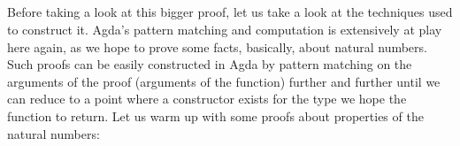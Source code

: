 {\begin{code}%
\>[0]\AgdaSpace{}%
\AgdaSymbol{:}%
\>[945I]\AgdaSymbol{(}\AgdaSpace{}%
\AgdaSymbol{:}\AgdaSpace{}%
\AgdaSymbol{)}\AgdaSpace{}%
\<%
\\
\>[.][@{}l@{}]\<[945I]%
\>[10]\AgdaSpace{}%
\AgdaSymbol{(}\AgdaSpace{}%
\AgdaSymbol{)}\AgdaSpace{}%
\AgdaSymbol{(}\AgdaSpace{}%
\AgdaSymbol{)}\<%
\\
%
\>[10]\<%
\\
%
\>[10]%
\>[953I]\AgdaSymbol{(}\AgdaSpace{}%
\AgdaSymbol{(}\AgdaSpace{}%
\AgdaSymbol{))}\<%
\\
\>[.][@{}l@{}]\<[953I]%
\>[27]\AgdaSymbol{(}\AgdaSpace{}%
\AgdaSymbol{(}\AgdaSpace{}%
\AgdaSymbol{))}\<%
\end{code}

Before taking a look at this bigger proof, let us take a look at the techniques used to construct it. Agda's pattern matching and computation is extensively at play here again, as we hope to prove some facts, basically, about natural numbers. Such proofs can be easily constructed in Agda by pattern matching on the arguments of the proof (arguments of the function) further and further until we can reduce to a point where a constructor exists for the type we hope the function to return. Let us warm up with some proofs about properties of the natural numbers:

}
